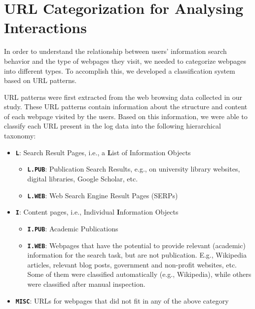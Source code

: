 \documentclass[letterpaper, nobind]{templates/ociamthesis}
\providecommand{\tightlist}{%
  \setlength{\itemsep}{0pt}\setlength{\parskip}{0pt}}
\begin{document}
\hypertarget{sec-res-url-categorization}{%
\section{URL Categorization for Analysing Interactions}\label{sec-res-url-categorization}}

In order to understand the relationship between users' information search behavior and the type of webpages they visit, we needed to categorize webpages into different types. To accomplish this, we developed a classification system based on URL patterns.

URL patterns were first extracted from the web browsing data collected in our study. These URL patterns contain information about the structure and content of each webpage visited by the users. Based on this information, we were able to classify each URL present in the log data into the following hierarchical taxonomy:

\begin{itemize}
\tightlist
\item
  \textbf{\texttt{L}}: Search Result Pages, i.e., a \textbf{L}ist of Information Objects

  \begin{itemize}
  \tightlist
  \item
    \textbf{\texttt{L.PUB}}: Publication Search Results, e.g., on university library websites, digital libraries, Google Scholar, etc.
  \item
    \textbf{\texttt{L.WEB}}: Web Search Engine Result Pages (SERPs)
  \end{itemize}
\item
  \textbf{\texttt{I}}: Content pages, i.e., Individual \textbf{I}nformation Objects

  \begin{itemize}
  \tightlist
  \item
    \textbf{\texttt{I.PUB}}: Academic Publications
  \item
    \textbf{\texttt{I.WEB}}: Webpages that have the potential to provide relevant (academic) information for the search task, but are not publication. E.g., Wikipedia articles, relevant blog posts, government and non-profit websites, etc. Some of them were classified automatically (e.g., Wikipedia), while others were classified after manual inspection.
  \end{itemize}
\item
  \textbf{\texttt{MISC}}: URLs for webpages that did not fit in any of the above category
\end{itemize}
\end{document}
